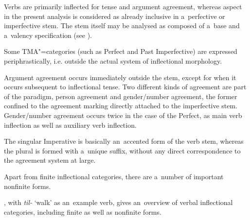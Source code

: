 Verbs are primarily inflected for tense and argument agreement, whereas aspect in the present analysis is considered as already inclusive in a~perfective or imperfective stem. The stem itself may be analysed as composed of a~base and a~valency specification (see ). 


Some TMA"=categories (such as Perfect and Past Imperfective) are expressed periphrastically, i.e. outside the actual system of inflectional morphology. 


Argument agreement occurs immediately outside the stem, except for when it occurs subsequent to inflectional tense. Two different kinds of agreement are part of the paradigm, person agreement and gender/number agreement, the former confined to the agreement marking directly attached to the imperfective stem. Gender/number agreement occurs twice in the case of the Perfect, as main verb inflection as well as auxiliary verb inflection. 


The singular Imperative is basically an~accented form of the verb stem, whereas the plural is formed with a~unique suffix, without any direct correspondence to the agreement system at large.


Apart from finite inflectional categories, there are a~number of important nonfinite forms.


, with \textit{til-} `walk' as an~example verb, gives an~overview of verbal inflectional categories, including finite as well as nonfinite forms.


